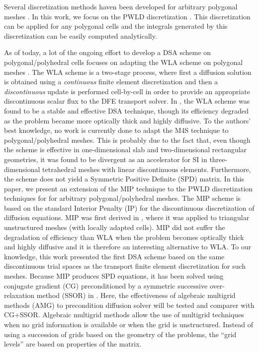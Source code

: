 Several discretization methods haven been developed for 
arbitrary polygonal meshes \cite{pwld_2d,pwld_3d,cfm_dfm,pwl_diffusion,
palmer_fe,mimetic,cell_centered_diff,palmer_proc,palmer_ane,wachspress,pwbld}.
In this work, we focus on the PWLD discretization \cite{pwld_2d,pwld_3d}. This
discretization can be applied for any polygonal cells and the integrals
generated by this discretization can be easily computed analytically. 

As of today, a lot of the ongoing effort to develop a DSA scheme on
polygonal/polyhedral cells focuses on adapting the WLA scheme on polygonal meshes
\cite{cfm_dfm,wla_pwl}. The WLA scheme is a two-stage process, where first a
diffusion solution is obtained using a {\em continuous} finite element
discretization and then a {\em discontinuous } update is performed cell-by-cell 
in order to provide an appropriate discontinuous scalar flux to the DFE transport 
solver. In \cite{consistent_p1}, the WLA scheme was
found to be a stable and effective DSA technique, though its efficiency
degraded as the problem became more optically thick and highly diffusive.
To the authors' best knowledge, no work is currently done to adapt the M4S 
technique to polygonal/polyhedral meshes. This is probably due to the fact
that, even though the scheme is effective in one-dimensional slab and
two-dimensional rectangular geometries, it was found to be divergent as an
accelerator for SI in
three-dimensional tetrahedral meshes with linear discontinuous elements.
Furthermore, the scheme does not yield a Symmetric Positive Definite (SPD)
matrix. In this paper, we present an extension of the MIP technique to the
PWLD discretization techniques for for arbitrary polygonal/polyhedral meshes.
The MIP scheme is based on the standard Interior Penalty (IP) for the
discontinuous discretization of diffusion equations. MIP was first derived in
\cite{mip}, where it was applied to triangular unstructured meshes (with
locally adapted cells). MIP did not suffer the degradation of efficiency 
than WLA when the
problem becomes optically thick and highly diffusive and it is therefore an
interesting alternative to WLA. To our knowledge, this work presented the
first DSA scheme based on the same discontinuous trial spaces as the transport
finite element discretization for such meshes. Because MIP produces SPD
equations, it has been solved using conjugate gradient (CG) preconditioned by
a symmetric successive over-relaxation method (SSOR) in \cite{mip}. Here, the
effectiveness of algebraic multigrid methods (AMG) to precondition diffusion
solver \cite{amg,amg_course} will be tested and comparer with CG+SSOR.
Algebraic multigrid methods allow the use of multigrid techniques when no grid
information is available or when the grid is unstructured. Instead of using a
succession of grids based on the geometry of the problems, the ``grid levels''
are based on properties of the matrix.
